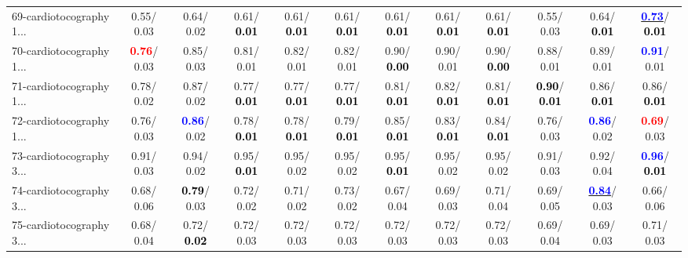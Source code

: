 \begin{table}[h]
\begin{center}
{\begin{tabular}{lc|c|c|c|c|c|c|c|c|c|c}
69-cardiotocography 1... &   0.55/  0.03 &   0.64/  0.02 &   0.61/\textcolor{black}{\textbf{  0.01}} &   0.61/\textcolor{black}{\textbf{  0.01}} &   0.61/\textcolor{black}{\textbf{  0.01}} &   0.61/\textcolor{black}{\textbf{  0.01}} &   0.61/\textcolor{black}{\textbf{  0.01}} &   0.61/\textcolor{black}{\textbf{  0.01}} &   0.55/  0.03 &   0.64/\textcolor{black}{\textbf{  0.01}} & \underline{\textcolor{blue}{\textbf{  0.73}}}/\textcolor{black}{\textbf{  0.01}} \\
70-cardiotocography 1... & \textcolor{red}{\textbf{  0.76}}/  0.03 &   0.85/  0.03 &   0.81/  0.01 &   0.82/  0.01 &   0.82/  0.01 &   0.90/\textcolor{black}{\textbf{  0.00}} &   0.90/  0.01 &   0.90/\textcolor{black}{\textbf{  0.00}} &   0.88/  0.01 &   0.89/  0.01 & \textcolor{blue}{\textbf{  0.91}}/  0.01 \\
71-cardiotocography 1... &   0.78/  0.02 &   0.87/  0.02 &   0.77/\textcolor{black}{\textbf{  0.01}} &   0.77/\textcolor{black}{\textbf{  0.01}} &   0.77/\textcolor{black}{\textbf{  0.01}} &   0.81/\textcolor{black}{\textbf{  0.01}} &   0.82/\textcolor{black}{\textbf{  0.01}} &   0.81/\textcolor{black}{\textbf{  0.01}} & \textcolor{black}{\textbf{  0.90}}/\textcolor{black}{\textbf{  0.01}} &   0.86/\textcolor{black}{\textbf{  0.01}} &   0.86/\textcolor{black}{\textbf{  0.01}} \\ \hline
72-cardiotocography 1... &   0.76/  0.03 & \textcolor{blue}{\textbf{  0.86}}/  0.02 &   0.78/\textcolor{black}{\textbf{  0.01}} &   0.78/\textcolor{black}{\textbf{  0.01}} &   0.79/\textcolor{black}{\textbf{  0.01}} &   0.85/\textcolor{black}{\textbf{  0.01}} &   0.83/\textcolor{black}{\textbf{  0.01}} &   0.84/\textcolor{black}{\textbf{  0.01}} &   0.76/  0.03 & \textcolor{blue}{\textbf{  0.86}}/  0.02 & \textcolor{red}{\textbf{  0.69}}/  0.03 \\
73-cardiotocography 3... &   0.91/  0.03 &   0.94/  0.02 &   0.95/\textcolor{black}{\textbf{  0.01}} &   0.95/  0.02 &   0.95/  0.02 &   0.95/\textcolor{black}{\textbf{  0.01}} &   0.95/  0.02 &   0.95/  0.02 &   0.91/  0.03 &   0.92/  0.04 & \textcolor{blue}{\textbf{  0.96}}/\textcolor{black}{\textbf{  0.01}} \\
74-cardiotocography 3... &   0.68/  0.06 & \textcolor{black}{\textbf{  0.79}}/  0.03 &   0.72/  0.02 &   0.71/  0.02 &   0.73/  0.02 &   0.67/  0.04 &   0.69/  0.03 &   0.71/  0.04 &   0.69/  0.05 & \underline{\textcolor{blue}{\textbf{  0.84}}}/  0.03 &   0.66/  0.06 \\
75-cardiotocography 3... &   0.68/  0.04 &   0.72/\textcolor{black}{\textbf{  0.02}} &   0.72/  0.03 &   0.72/  0.03 &   0.72/  0.03 &   0.72/  0.03 &   0.72/  0.03 &   0.72/  0.03 &   0.69/  0.04 &   0.69/  0.03 &   0.71/  0.03 \\

\end{tabular}}
\end{center}
\end{table}
